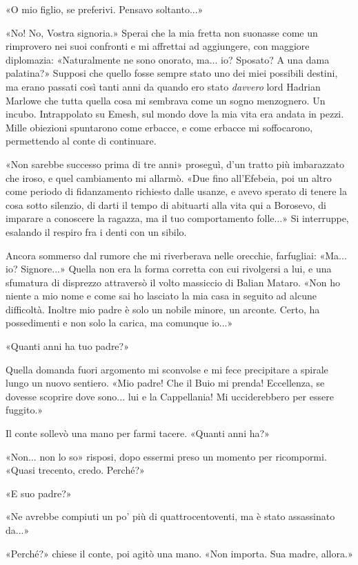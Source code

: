 «O mio figlio, se preferivi. Pensavo soltanto...»

«No! No, Vostra signoria.» Sperai che la mia fretta non suonasse come un
rimprovero nei suoi confronti e mi affrettai ad aggiungere, con maggiore
diplomazia: «Naturalmente ne sono onorato, ma... io? Sposato? A una dama
palatina?» Supposi che quello fosse sempre stato uno dei miei possibili
destini, ma erano passati così tanti anni da quando ero stato
\emph{davvero} lord Hadrian Marlowe che tutta quella cosa mi sembrava
come un sogno menzognero. Un incubo. Intrappolato su Emesh, sul mondo
dove la mia vita era andata in pezzi. Mille obiezioni spuntarono come
erbacce, e come erbacce mi soffocarono, permettendo al conte di
continuare.

«Non sarebbe successo prima di tre anni» proseguì, d'un tratto più
imbarazzato che iroso, e quel cambiamento mi allarmò. «Due fino
all'Efebeia, poi un altro come periodo di fidanzamento richiesto dalle
usanze, e avevo sperato di tenere la cosa sotto silenzio, di darti il
tempo di abituarti alla vita qui a Borosevo, di imparare a conoscere la
ragazza, ma il tuo comportamento folle...» Si interruppe, esalando il
respiro fra i denti con un sibilo.

Ancora sommerso dal rumore che mi riverberava nelle orecchie,
farfugliai: «Ma... io? Signore...» Quella non era la forma corretta con
cui rivolgersi a lui, e una sfumatura di disprezzo attraversò il volto
massiccio di Balian Mataro. «Non ho niente a mio nome e come sai ho
lasciato la mia casa in seguito ad alcune difficoltà. Inoltre mio padre
è solo un nobile minore, un arconte. Certo, ha possedimenti e non solo
la carica, ma comunque io...»

«Quanti anni ha tuo padre?»

Quella domanda fuori argomento mi sconvolse e mi fece precipitare a
spirale lungo un nuovo sentiero. «Mio padre! Che il Buio mi prenda!
Eccellenza, se dovesse scoprire dove sono... lui e la Cappellania! Mi
ucciderebbero per essere fuggito.»

Il conte sollevò una mano per farmi tacere. «Quanti anni ha?»

«Non... non lo so» risposi, dopo essermi preso un momento per
ricompormi. «Quasi trecento, credo. Perché?»

«E suo padre?»

«Ne avrebbe compiuti un po' più di quattrocentoventi, ma è stato
assassinato da...»

«Perché?» chiese il conte, poi agitò una mano. «Non importa. Sua madre,
allora.»

